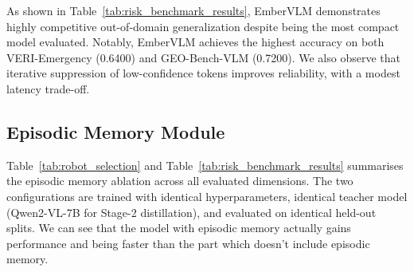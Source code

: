\documentclass[runningheads]{llncs}
\begin{document}
As shown in Table~\ref{tab:risk_benchmark_results}, EmberVLM demonstrates highly competitive out-of-domain generalization despite being the most compact model evaluated. Notably, EmberVLM achieves the highest accuracy on both VERI-Emergency (0.6400) and GEO-Bench-VLM (0.7200). We also observe that iterative suppression of low-confidence tokens improves reliability, with a modest latency trade-off.

\begin{table}[t]
    \centering
    \caption{Performance comparisons on mission-critical visual recognition benchmarks.}
    \label{tab:risk_benchmark_results}
\end{table}


\subsection{Episodic Memory Module}
Table~\ref{tab:robot_selection} and Table~\ref{tab:risk_benchmark_results} summarises the episodic memory
ablation across all evaluated dimensions. The two configurations
are trained with identical hyperparameters, identical teacher model
(Qwen2-VL-7B for Stage-2 distillation), and evaluated on identical
held-out splits. We can see that the model with episodic memory actually gains performance and being faster than the part which doesn't include episodic memory.
\end{document}
